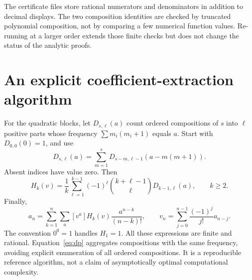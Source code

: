 \documentclass[11pt,a4paper]{article}
\numberwithin{equation}{section}
\theoremstyle{definition}
\theoremstyle{remark}
\begin{document}
The certificate files store rational numerators and denominators in
addition to decimal displays.  The two composition identities are checked
by truncated polynomial composition, not by comparing a few numerical
function values.  Re-running at a larger order extends those finite checks
but does not change the status of the analytic proofs.

\section{An explicit coefficient-extraction algorithm}
For the quadratic blocks, let $D_{s,\ell}(a)$ count ordered compositions
of $s$ into $\ell$ positive parts whose frequency
$\sum m_i(m_i+1)$ equals $a$.  Start with $D_{0,0}(0)=1$, and use
\begin{equation}
 D_{s,\ell}(a)=\sum_{m=1}^{s}
                     D_{s-m,\ell-1}(a-m(m+1)).
 \label{eq:dp}
\end{equation}
Absent indices have value zero.  Then
\begin{equation}
 [v^a]H_k(v)=\frac1k\sum_{\ell=1}^{k-1}
          (-1)^\ell\binom{k+\ell-1}{\ell}D_{k-1,\ell}(a),
 \qquad k\ge2.
 \label{eq:dp-H}
\end{equation}
Finally,
\begin{equation}
 a_n=\sum_{k=1}^n\sum_a[v^a]H_k(v)\frac{a^{n-k}}{(n-k)!},
 \qquad
 v_n=\sum_{j=0}^{n-1}\frac{(-1)^j}{j!}a_{n-j}.
 \label{eq:coeff-algorithm}
\end{equation}
The convention $0^0=1$ handles $H_1=1$.  All these expressions are finite
and rational.  Equation~\eqref{eq:dp} aggregates compositions with the same
frequency, avoiding explicit enumeration of all ordered compositions.
It is a reproducible reference algorithm, not a claim of asymptotically
optimal computational complexity.
\end{document}
